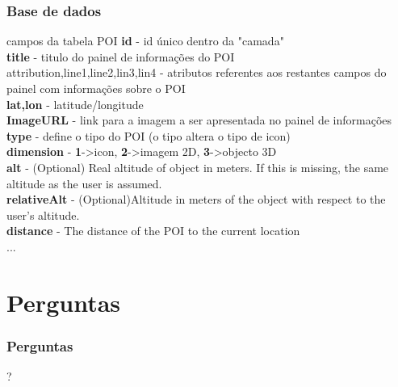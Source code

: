 \documentclass{beamer}
\begin{document}
\begin{frame} \frametitle{Base de dados}
\begin{block}{campos da tabela POI}
\textbf{id} - id único dentro da "camada"\\
\textbf{title} - titulo do painel de informações do POI\\
attribution,line1,line2,lin3,lin4 - atributos referentes aos restantes campos do painel com informações sobre o POI\\
\textbf{lat,lon} - latitude/longitude\\
\textbf{ImageURL} - link para a imagem a ser apresentada no painel de informações\\
\textbf{type} - define o tipo do POI (o tipo altera o tipo de icon)\\
\textbf{dimension} - \textbf{1}-\textgreater  icon, \textbf{2}-\textgreater  imagem 2D, \textbf{3}-\textgreater   objecto 3D\\
\textbf{alt} - (Optional) Real altitude of object in meters. If this is missing, the same altitude as the user is assumed.\\
\textbf{relativeAlt} - (Optional)Altitude in meters of the object with respect to the user's altitude.\\
\textbf{distance} - The distance of the POI to the current location\\

...
\end{block}
\end{frame}


\section*{Perguntas}
\begin{frame} \frametitle{Perguntas}
\begin{center}\huge{?}\end{center}
\end{frame}
\end{document}
